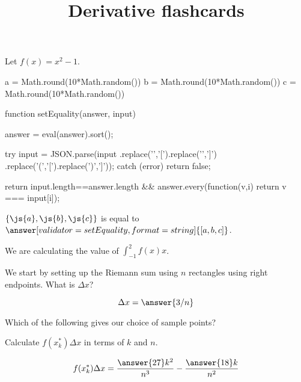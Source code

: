 \documentclass{ximera}
\title{Derivative flashcards}
\begin{document}
\begin{exercise}
Let $f(x) = x^2-1$.

\begin{javascript}
  a = Math.round(10*Math.random())
  b = Math.round(10*Math.random())
  c = Math.round(10*Math.random())  

  function setEquality(answer, input) {
    answer = eval(answer).sort();
    
    try {
      input = JSON.parse(input
        .replace('{','[').replace('}',']')
        .replace('(','[').replace(')',']'));
    } catch (error) {
      return false;
    }
    
     return input.length==answer.length &&
       answer.every(function(v,i) { return v === input[i]});
   }

\end{javascript}

\begin{problem}
  $\{\js{a},\js{b},\js{c}\}$ is equal to $\answer[validator=setEquality,format=string]{[a,b,c]}$.
\end{problem}

We are calculating the value of $\displaystyle \int_{-1}^{2} f(x)  x$.
 

We start by setting up the Riemann sum using $n$ rectangles using right endpoints.
What is $\Delta x$?
     
\[ \Delta x = \answer{3/n} \]

\begin{exercise}
  Which of the following gives our choice of sample points?
  \begin{multipleChoice}
  \end{multipleChoice}
  
  \begin{exercise}
    Calculate $f(x_k^*) \Delta x$ in terms of $k$ and $n$.
    
    \[ f(x_k^*) \Delta x = \frac{\answer{27}k^2}{n^3}-\frac{\answer{18}k}{n^2} \]
  \end{exercise}
\end{exercise}
\end{exercise}
\end{document}
